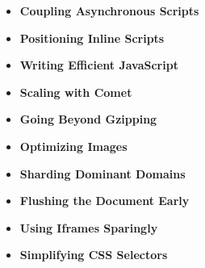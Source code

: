 \begin{itemize}
\item \textbf{Coupling Asynchronous Scripts}



\item \textbf{Positioning Inline Scripts}



\item \textbf{Writing Efficient JavaScript}



\item \textbf{Scaling with Comet}



\item \textbf{Going Beyond Gzipping}



\item \textbf{Optimizing Images}



\item \textbf{Sharding Dominant Domains}



\item \textbf{Flushing the Document Early}



\item \textbf{Using Iframes Sparingly}



\item \textbf{Simplifying CSS Selectors}



\end{itemize}
